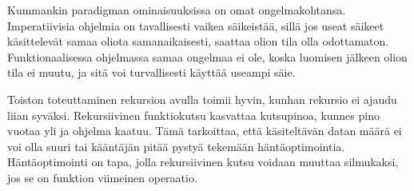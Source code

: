 Kummankin paradigman ominaisuuksissa on omat ongelmakohtansa. Imperatiivisia ohjelmia on tavallisesti vaikea säikeistää, sillä jos useat säikeet käsittelevät samaa oliota samanaikaisesti, saattaa olion tila olla odottamaton. Funktionaalisessa ohjelmassa samaa ongelmaa ei ole, koska luomisen jälkeen olion tila ei muutu, ja sitä voi turvallisesti käyttää useampi säie. 
\cite[Luku 6]{prorgrammingInScala3rd}

Toiston toteuttaminen rekursion avulla toimii hyvin, kunhan rekursio ei ajaudu liian syväksi. Rekursiivinen funktiokutsu kasvattaa kutsupinoa, kunnes pino vuotaa yli ja ohjelma kaatuu. Tämä tarkoittaa, että käsiteltävän datan määrä ei voi olla suuri tai kääntäjän pitää pystyä tekemään häntäoptimointia. Häntäoptimointi on tapa, jolla rekursiivinen kutsu voidaan muuttaa silmukaksi, jos se on funktion viimeinen operaatio.
\cite[Luku 8]{prorgrammingInScala3rd} 
